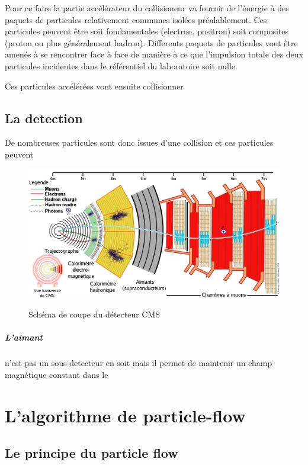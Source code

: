 \documentclass[a4paper,12pt]{report}
\begin{document}
Pour ce faire la partie accélérateur du collisioneur va fournir de l'énergie à des paquets de particules relativement communes isolées préalablement. Ces particules peuvent être soit fondamentales (electron, positron) soit composites (proton ou plus généralement hadron). Differents paquets de particules vont être amenés à se rencontrer face à face de manière à ce que l'impulsion totale des deux particules incidentes dans le référentiel du laboratoire soit nulle.

Ces particules accélérées vont ensuite collisionner %

\section{La detection}

De nombreuses particules sont donc issues d'une collision et ces particules peuvent 

\begin{figure}[h]
\caption{Schéma de coupe du détecteur CMS}
\includegraphics[width=\textwidth]{Schema_transverse_cms}
\label{CMScouches}
\end{figure}

\paragraph{L'aimant} n'est pas un sous-detecteur en soit mais il permet de maintenir un champ magnétique constant dans le 

\chapter{L'algorithme de particle-flow}

\section{Le principe du particle flow}
\end{document}
